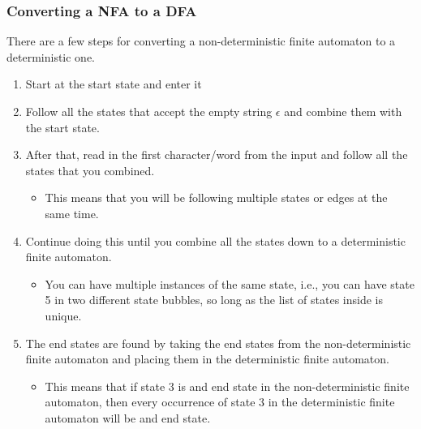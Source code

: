 \subsubsection{Converting a NFA to a DFA}\label{subsubsec:Convert_NFA_to_DFA}
There are a few steps for converting a non-deterministic finite automaton to a deterministic one.
\begin{enumerate}[noitemsep]
\item Start at the start state and enter it
\item Follow all the states that accept the empty string $\epsilon$ and combine them with the start state.
\item After that, read in the first character/word from the input and follow all the states that you combined.
  \begin{itemize}[noitemsep]
  \item This means that you will be following multiple states or edges at the same time.
  \end{itemize}
\item Continue doing this until you combine all the states down to a deterministic finite automaton.
  \begin{itemize}[noitemsep]
  \item You can have multiple instances of the same state, i.e., you can have state 5 in two different state bubbles, so long as the list of states inside is unique.
  \end{itemize}
\item The end states are found by taking the end states from the non-deterministic finite automaton and placing them in the deterministic finite automaton.
  \begin{itemize}[noitemsep]
  \item This means that if state 3 is and end state in the non-deterministic finite automaton, then every occurrence of state 3 in the deterministic finite automaton will be and end state.
  \end{itemize}
\end{enumerate}

